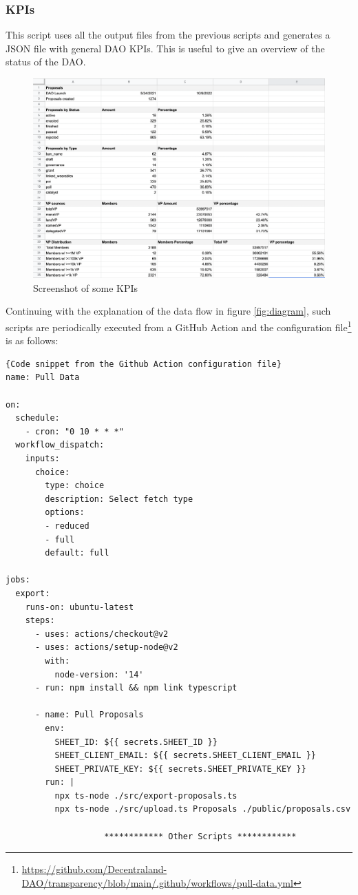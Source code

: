 \documentclass[MSE,Master,english]{twbook}%
\begin{document}
\subsubsection{KPIs}
This script uses all the output files from the previous scripts and generates a JSON file with general DAO KPIs. This is useful to give an overview of the status of the DAO.
\begin{figure}[H]
  \centering
  \includegraphics[width=\textwidth]{kpis.png}
  \caption{Screenshot of some KPIs}
  \label{fig:kpis}
\end{figure}

\pagebreak

Continuing with the explanation of the data flow in figure \ref{fig:diagram}, such scripts are periodically executed from a GitHub Action and the configuration file\footnote{\url{https://github.com/Decentraland-DAO/transparency/blob/main/.github/workflows/pull-data.yml}} is as follows: \\

\begin{lstlisting}{Code snippet from the Github Action configuration file}
name: Pull Data

on:
  schedule:
    - cron: "0 10 * * *"
  workflow_dispatch:
    inputs:
      choice:
        type: choice
        description: Select fetch type
        options:
        - reduced
        - full
        default: full

jobs:
  export:
    runs-on: ubuntu-latest
    steps:
      - uses: actions/checkout@v2
      - uses: actions/setup-node@v2
        with:
          node-version: '14'
      - run: npm install && npm link typescript

      - name: Pull Proposals
        env:
          SHEET_ID: ${{ secrets.SHEET_ID }}
          SHEET_CLIENT_EMAIL: ${{ secrets.SHEET_CLIENT_EMAIL }}
          SHEET_PRIVATE_KEY: ${{ secrets.SHEET_PRIVATE_KEY }}
        run: |
          npx ts-node ./src/export-proposals.ts
          npx ts-node ./src/upload.ts Proposals ./public/proposals.csv

                    ************ Other Scripts ************
\end{lstlisting}
\end{document}
